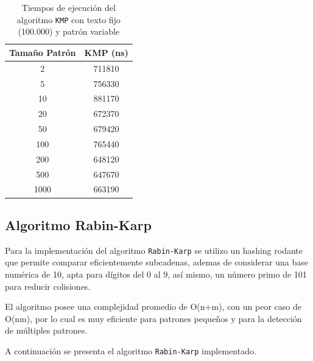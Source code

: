 \documentclass[12pt]{article}
\begin{document}
	\begin{table}[H]
		\centering
		\begin{tabular}{|c|c|}
			\hline
			\textbf{Tamaño Patrón} & \textbf{KMP (ns)} \\
			\hline
			2     & 711810  \\
			5     & 756330  \\
			10    & 881170  \\
			20    & 672370  \\
			50    & 679420  \\
			100   & 765440  \\
			200   & 648120  \\
			500   & 647670  \\
			1000  & 663190  \\
			\hline
		\end{tabular}
		\caption{Tiempos de ejecución del algoritmo \texttt{KMP} con texto fijo (100.000) y patrón variable}
		\label{tab:kmp_patron}
	\end{table}
	
	
	\subsection{Algoritmo Rabin-Karp}
	
	Para la implementación del algoritmo \texttt{Rabin-Karp} se utilizo un hashing rodante que permite comparar eficientemente subcadenas, ademas de considerar una base numérica de 10, apta para dígitos del 0 al 9, así mismo, un número primo de 101 para reducir colisiones. 
	
	El algoritmo posee una complejidad promedio de O(n+m), con un peor caso de O(nm), por lo cual es muy eficiente para patrones pequeños y para la detección de múltiples patrones.
	
	A continuación se presenta el algoritmo \texttt{Rabin-Karp} implementado.
	
\end{document}
